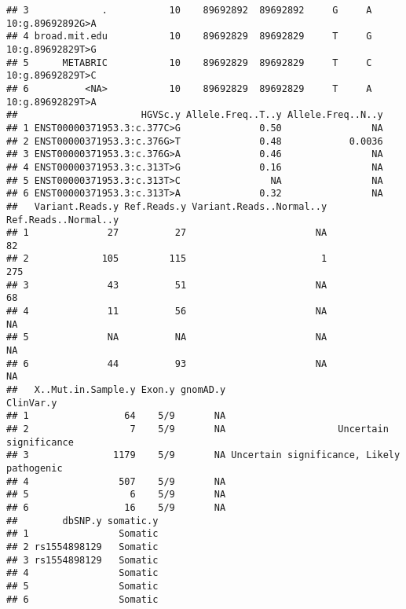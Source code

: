 \documentclass[
]{article}
\begin{document}
\begin{verbatim}
## 3             .           10    89692892  89692892     G     A 10:g.89692892G>A
## 4 broad.mit.edu           10    89692829  89692829     T     G 10:g.89692829T>G
## 5      METABRIC           10    89692829  89692829     T     C 10:g.89692829T>C
## 6          <NA>           10    89692829  89692829     T     A 10:g.89692829T>A
##                      HGVSc.y Allele.Freq..T..y Allele.Freq..N..y
## 1 ENST00000371953.3:c.377C>G              0.50                NA
## 2 ENST00000371953.3:c.376G>T              0.48            0.0036
## 3 ENST00000371953.3:c.376G>A              0.46                NA
## 4 ENST00000371953.3:c.313T>G              0.16                NA
## 5 ENST00000371953.3:c.313T>C                NA                NA
## 6 ENST00000371953.3:c.313T>A              0.32                NA
##   Variant.Reads.y Ref.Reads.y Variant.Reads..Normal..y Ref.Reads..Normal..y
## 1              27          27                       NA                   82
## 2             105         115                        1                  275
## 3              43          51                       NA                   68
## 4              11          56                       NA                   NA
## 5              NA          NA                       NA                   NA
## 6              44          93                       NA                   NA
##   X..Mut.in.Sample.y Exon.y gnomAD.y                                 ClinVar.y
## 1                 64    5/9       NA                                          
## 2                  7    5/9       NA                    Uncertain significance
## 3               1179    5/9       NA Uncertain significance, Likely pathogenic
## 4                507    5/9       NA                                          
## 5                  6    5/9       NA                                          
## 6                 16    5/9       NA                                          
##        dbSNP.y somatic.y
## 1                Somatic
## 2 rs1554898129   Somatic
## 3 rs1554898129   Somatic
## 4                Somatic
## 5                Somatic
## 6                Somatic
\end{verbatim}
\end{document}
